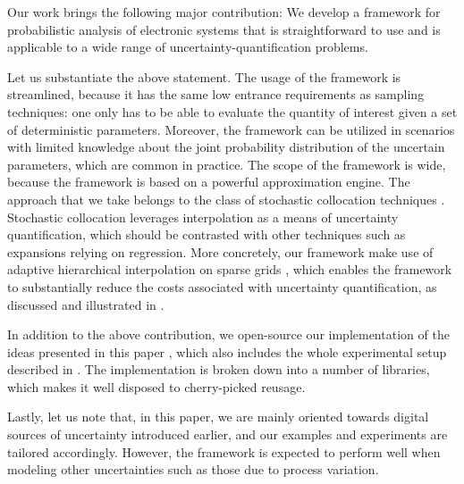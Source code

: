 Our work brings the following major contribution: We develop a framework for
probabilistic analysis of electronic systems that is straightforward to use and
is applicable to a wide range of uncertainty-quantification problems.

Let us substantiate the above statement. The usage of the framework is
streamlined, because it has the same low entrance requirements as sampling
techniques: one only has to be able to evaluate the quantity of interest given a
set of deterministic parameters. Moreover, the framework can be utilized in
scenarios with limited knowledge about the joint probability distribution of the
uncertain parameters, which are common in practice. The scope of the framework
is wide, because the framework is based on a powerful approximation engine. The
approach that we take belongs to the class of stochastic collocation techniques
\cite{xiu2010}. Stochastic collocation leverages interpolation as a means of
uncertainty quantification, which should be contrasted with other techniques
such as  expansions relying on regression. More concretely, our framework
make use of adaptive hierarchical interpolation on sparse grids
\cite{jakeman2012, klimke2006, ma2009}, which enables the framework to
substantially reduce the costs associated with uncertainty quantification, as
discussed and illustrated in .

In addition to the above contribution, we open-source our implementation of the
ideas presented in this paper \cite{sources}, which also includes the whole
experimental setup described in . The implementation is
broken down into a number of libraries, which makes it well disposed to
cherry-picked reusage.

Lastly, let us note that, in this paper, we are mainly oriented towards digital
sources of uncertainty introduced earlier, and our examples and experiments are
tailored accordingly. However, the framework is expected to perform well when
modeling other uncertainties such as those due to process variation.
